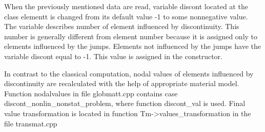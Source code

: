 When the previously mentioned data are read, variable discont located
at the class elementt is changed from its default value -1 to some
nonnegative value. The variable describes number of element influenced
by discontinuity. This number is generally different from element number
because it is assigned only to elements influenced by the jumps. Elements
not influenced by the jumps have the variable discont equal to -1.
This value is assigned in the constructor.

In contrast to the classical computation, nodal values of elements influenced
by discontinuity are recalculated with the help of appropriate material model.
Function nodalvalues in file globmatt.cpp contains case
discont\_nonlin\_nonstat\_problem, where function discont\_val is used.
Final value transformation is located in function     
Tm->values\_transformation in the file transmat.cpp

